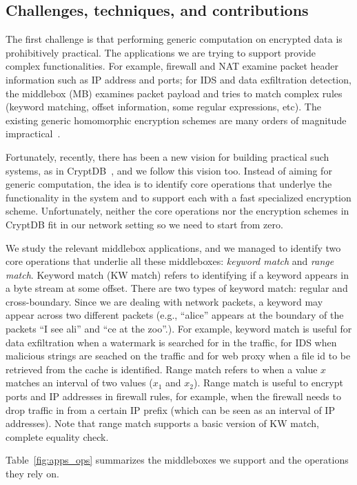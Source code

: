     \subsection{Challenges, techniques, and contributions}
    
The first challenge is that performing generic computation on encrypted data is prohibitively practical. The applications we are trying to support provide complex functionalities. For example, firewall and NAT examine packet header information such as IP address and ports; for IDS and data exfiltration detection, the middlebox (MB) examines packet payload and tries to match complex rules (keyword matching, offset information, some regular expressions, etc). The existing generic homomorphic encryption schemes are many orders of magnitude impractical~\cite{aesFHE}.

Fortunately, recently, there has been a new vision for building practical such systems, as in CryptDB~\cite{cryptdb}, and we follow this vision too. Instead of aiming for generic computation, the idea is to identify core operations that underlye the functionality in the system and to support each with a fast specialized encryption scheme. Unfortunately, neither the core operations nor the encryption schemes in CryptDB fit in our network setting so we need to start from zero.

We study the relevant middlebox applications, and we managed to identify two core operations that underlie all these middleboxes: {\em keyword match} and {\em range match}. Keyword match (KW match) refers to  identifying if a keyword appears in a byte stream at some offset. There are two types of keyword match: regular and cross-boundary. Since we are dealing with network packets, a keyword may appear across two different packets (e.g., ``alice'' appears at the boundary of the packets ``I see ali'' and ``ce at the zoo''.). For example, keyword match is useful for data exfiltration when a watermark is searched for in the traffic, for IDS when malicious strings are seached on the traffic and for web proxy when a file id to be retrieved from the cache is identified. 
Range match refers to when a value $x$ matches an interval of two values ($x_1$ and $x_2$). Range match is useful to encrypt ports and IP addresses in firewall rules, for example, when the firewall needs to drop traffic in from a certain IP prefix (which can be seen as an interval of IP addresses). Note that range match supports a basic version of KW match, complete equality check. 

Table~\ref{fig:apps_ops} summarizes the middleboxes we support and the operations they rely on. 

